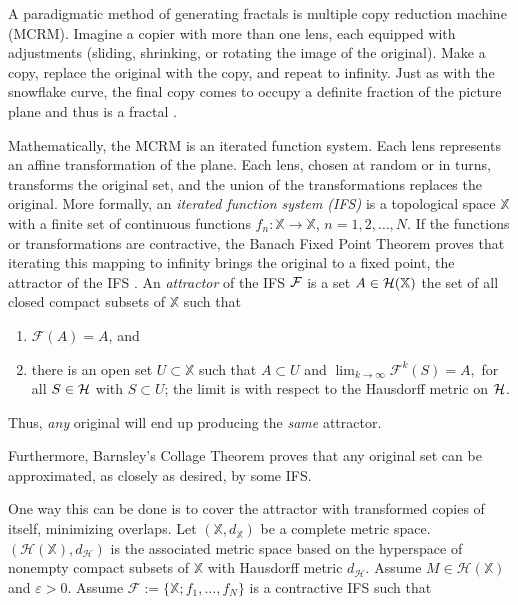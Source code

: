 \documentclass[english,11pt,letterpaper,onecolumn]{scrartcl}
\numberwithin{equation}{section}
\newcommand{\X}{\mathbb{X}}
\newcommand{\cF}{\mathcal{F}}
\newcommand{\calH}{\mathcal{H}}
\begin{document}

A paradigmatic method of generating fractals is multiple copy reduction machine
(MCRM). Imagine a copier with more than one lens, each equipped with adjustments
(sliding, shrinking, or rotating the image of the original). Make a copy,
replace the original with the copy, and repeat to infinity. Just as with the
snowflake curve, the final copy comes to occupy a definite fraction of the
picture plane and thus is a fractal \cite{chaosandfractals}.

Mathematically, the MCRM is an iterated function system. Each lens represents an
affine transformation of the plane. Each lens, chosen at random or in turns,
transforms the original set, and the union of the transformations replaces the
original. More formally, an \emph{iterated function system (IFS)} is a
topological space $\mathbb{X}$ with a finite set of continuous functions
$f_{n}:\X\rightarrow \X$, $n=1,2,\dots,N$. If the functions or transformations
are contractive, the Banach Fixed Point Theorem proves that iterating this
mapping to infinity brings the original to a fixed point, the attractor of the
IFS \cite{chaosandfractals, barnsley1985iterated, 10.2307/24893080,
fractalseverywhere}. An \emph{attractor} of the IFS $\cal{F}$ is a set $A\in
\cal{H}(\X)$ the set of all closed compact subsets of $\X$ such that

\begin{enumerate}
\item $\cF(A)=A$, and
\item there is an open set $U\subset \X$ such that $A\subset U$ and
$\lim_{k\rightarrow\infty}\mathcal{F}^{k}(S)=A,$ for all $S\in \cal{H}$ with
$S\subset U$; the limit is with respect to the Hausdorff metric on $\cal{H}$.
\end{enumerate}

\noindent Thus, \textit{any} original will end up producing the
\textit{same} attractor.

Furthermore, Barnsley's Collage Theorem \cite{barnsley:1986:solution} proves
that any original set can be approximated, as closely as desired, by some IFS.

One way this can be done is to cover the attractor with transformed copies of
itself, minimizing overlaps. Let $(\mathbb{X},d_\mathbb{X})$ be a complete
metric space. $(\calH (\X), d_\calH)$ is the associated metric space based on
the hyperspace of nonempty compact subsets of $\X$ with Hausdorff metric
$d_\calH$. Assume $M\in\calH(\X)$ and $\varepsilon > 0$. Assume $\cF := \{\X;
f_1, \ldots, f_N\}$ is a contractive IFS such that
\end{document}
